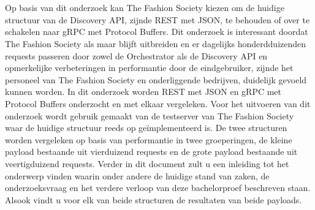 
%
%

%



\chapter*{}

Op basis van dit onderzoek kan The Fashion Society kiezen om de huidige structuur van de Discovery API, zijnde REST met JSON, te behouden of over te schakelen naar gRPC met Protocol Buffers. Dit onderzoek is interessant doordat The Fashion Society als maar blijft uitbreiden en er dagelijks honderdduizenden requests passeren door zowel de Orchestrator als de Discovery API en opmerkelijke verbeteringen in performantie door de eindgebruiker, zijnde het personeel van The Fashion Society en onderliggende bedrijven, duidelijk gevoeld kunnen worden. In dit onderzoek worden REST met JSON en gRPC met Protocol Buffers onderzocht en met elkaar vergeleken. Voor het uitvoeren van dit onderzoek wordt gebruik gemaakt van de testserver van The Fashion Society waar de huidige structuur reeds op geïmplementeerd is. De twee structuren worden vergeleken op basis van performantie in twee groeperingen, de kleine payload bestaande uit vierduizend requests en de grote payload bestaande uit veertigduizend requests. Verder in dit document zult u een inleiding tot het onderwerp vinden waarin onder andere de huidige stand van zaken, de onderzoeksvraag en het verdere verloop van deze bachelorproef beschreven staan. Alsook vindt u voor elk van beide structuren de resultaten van beide payloads.
